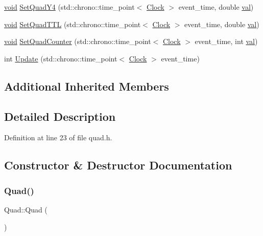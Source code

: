 \begin{DoxyCompactItemize}
\item 
\mbox{\hyperlink{glad_8h_a950fc91edb4504f62f1c577bf4727c29}{void}} \mbox{\hyperlink{class_quad_ae299f75dcd479f5eb6ba8efed578961b}{Set\+Quad\+Y4}} (std\+::chrono\+::time\+\_\+point$<$ \mbox{\hyperlink{universe_8h_a0ef8d951d1ca5ab3cfaf7ab4c7a6fd80}{Clock}} $>$ event\+\_\+time, double \mbox{\hyperlink{glad_8h_a26942fd2ed566ef553eae82d2c109c8f}{val}})
\item 
\mbox{\hyperlink{glad_8h_a950fc91edb4504f62f1c577bf4727c29}{void}} \mbox{\hyperlink{class_quad_a4d3a52272d572315198623e836ac0a97}{Set\+Quad\+T\+TL}} (std\+::chrono\+::time\+\_\+point$<$ \mbox{\hyperlink{universe_8h_a0ef8d951d1ca5ab3cfaf7ab4c7a6fd80}{Clock}} $>$ event\+\_\+time, double \mbox{\hyperlink{glad_8h_a26942fd2ed566ef553eae82d2c109c8f}{val}})
\item 
\mbox{\hyperlink{glad_8h_a950fc91edb4504f62f1c577bf4727c29}{void}} \mbox{\hyperlink{class_quad_a66ba58a32cf7b351e3e155efbdb46f8e}{Set\+Quad\+Counter}} (std\+::chrono\+::time\+\_\+point$<$ \mbox{\hyperlink{universe_8h_a0ef8d951d1ca5ab3cfaf7ab4c7a6fd80}{Clock}} $>$ event\+\_\+time, int \mbox{\hyperlink{glad_8h_a26942fd2ed566ef553eae82d2c109c8f}{val}})
\item 
int \mbox{\hyperlink{class_quad_a0710e6a7d77a34fdadbd2c36d03ade62}{Update}} (std\+::chrono\+::time\+\_\+point$<$ \mbox{\hyperlink{universe_8h_a0ef8d951d1ca5ab3cfaf7ab4c7a6fd80}{Clock}} $>$ event\+\_\+time)
\end{DoxyCompactItemize}
\subsection*{Additional Inherited Members}


\subsection{Detailed Description}


Definition at line 23 of file quad.\+h.



\subsection{Constructor \& Destructor Documentation}
\mbox{\label{class_quad_ae446d188d645cc5c512336f25d1a697a}} 
\subsubsection{\texorpdfstring{Quad()}{Quad()}\hspace{0.1cm}{\footnotesize\ttfamily [1/4]}}
{\footnotesize\ttfamily Quad\+::\+Quad (\begin{DoxyParamCaption}{ }\end{DoxyParamCaption})\hspace{0.3cm}{\ttfamily [inline]}}



